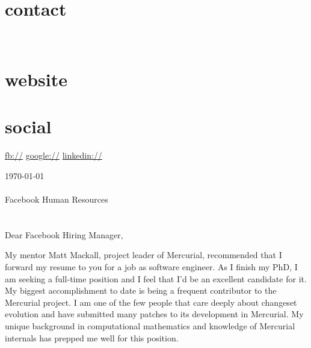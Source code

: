 \documentclass[]{fancy-cv}
\begin{document}

\begin{aside}
  \section{contact}
    \href{mailto:\myemail}{\myemail}
    ~
    \myphone
    ~
    \myaddress
    \mycity
  \section{website}
    \href{\mywebsite}{\mywebsite}
  \section{social}
    \href{http://facebook.com/\myfb}{fb://\myfb}
    \href{http://plug.google.com/\mygp}{google://\mygp}
    \href{http://www.linkedin.com/in/\mylinkedin}{linkedin://\mylinkedin}
\end{aside}

\vspace{.8em}
\large
\today\\
\\
Facebook Human Resources\\
\\
\\
Dear Facebook Hiring Manager,

My mentor Matt Mackall, project leader of Mercurial, recommended that I forward
my resume to you for a job as software engineer. As I finish my PhD, I am
seeking a full-time position and I feel that I'd be an excellent candidate for
it.
%
\newline\newline
%
My biggest accomplishment to date is being a frequent contributor to the
Mercurial project. I am one of the few people that care deeply about changeset
evolution and have submitted many patches to its development in Mercurial. My
unique background in computational mathematics and knowledge of Mercurial
internals has prepped me well for this position.
\end{document}

